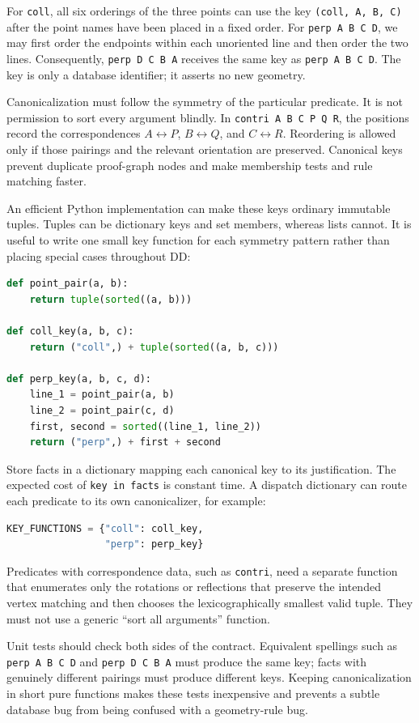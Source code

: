 \documentclass[reqno]{amsart}
\DeclareMathOperator{\1}{\textbf{1}}
\begin{document}
For \verb|coll|, all six orderings of the three points can use the key
\verb|(coll, A, B, C)| after the point names have been placed in a fixed
order. For \verb|perp A B C D|, we may first order the endpoints within each
unoriented line and then order the two lines. Consequently,
\verb|perp D C B A| receives the same key as \verb|perp A B C D|. The key is
only a database identifier; it asserts no new geometry.

Canonicalization must follow the symmetry of the particular predicate. It is
not permission to sort every argument blindly. In
\verb|contri A B C P Q R|, the positions record the correspondences
$A\leftrightarrow P$, $B\leftrightarrow Q$, and $C\leftrightarrow R$.
Reordering is allowed only if those pairings and the relevant orientation are
preserved. Canonical keys prevent duplicate proof-graph nodes and make
membership tests and rule matching faster.

An efficient Python implementation can make these keys ordinary immutable
tuples. Tuples can be dictionary keys and set members, whereas lists cannot.
It is useful to write one small key function for each symmetry pattern rather
than placing special cases throughout DD:
\begin{lstlisting}[language=Python]
def point_pair(a, b):
    return tuple(sorted((a, b)))

def coll_key(a, b, c):
    return ("coll",) + tuple(sorted((a, b, c)))

def perp_key(a, b, c, d):
    line_1 = point_pair(a, b)
    line_2 = point_pair(c, d)
    first, second = sorted((line_1, line_2))
    return ("perp",) + first + second
\end{lstlisting}
Store facts in a dictionary mapping each canonical key to its justification.
The expected cost of \verb|key in facts| is constant time. A dispatch
dictionary can route each predicate to its own canonicalizer, for example:
\begin{lstlisting}[language=Python]
KEY_FUNCTIONS = {"coll": coll_key,
                 "perp": perp_key}
\end{lstlisting}
Predicates with correspondence data, such
as \verb|contri|, need a separate function that enumerates only the rotations
or reflections that preserve the intended vertex matching and then chooses
the lexicographically smallest valid tuple. They must not use a generic
``sort all arguments'' function.

Unit tests should check both sides of the contract. Equivalent spellings such
as \verb|perp A B C D| and \verb|perp D C B A| must produce the same key;
facts with genuinely different pairings must produce different keys. Keeping
canonicalization in short pure functions makes these tests inexpensive and
prevents a subtle database bug from being confused with a geometry-rule bug.
\end{document}
